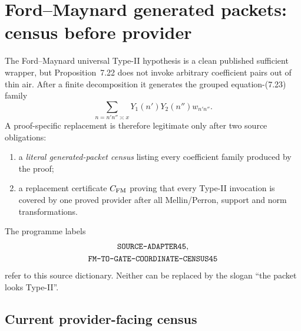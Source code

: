 \documentclass[11pt]{article}
\theoremstyle{definition}
\newcommand{\1}{\mathbf 1}
\begin{document}
\section{Ford--Maynard generated packets: census before provider}
\label{sec:ford-census}

The Ford--Maynard universal Type-II hypothesis is a clean published sufficient wrapper,
but Proposition~7.22 does not invoke arbitrary coefficient pairs out of thin air.  After a
finite decomposition it generates the grouped equation-(7.23) family
\[
\sum_{n=n'n''\asymp x}Y_1(n')Y_2(n'')w_{n'n''}.
\]
A proof-specific replacement is therefore legitimate only after two source obligations:
\begin{enumerate}[leftmargin=1.7em]
\item a \emph{literal generated-packet census} listing every coefficient family produced by
  the proof;
\item a replacement certificate $C_{\rm FM}$ proving that every Type-II invocation is
  covered by one proved provider after all Mellin/Perron, support and norm transformations.
\end{enumerate}

The programme labels
\[
\begin{gathered}
\text{\ttfamily SOURCE-ADAPTER45},\\
\text{\ttfamily FM-TO-GATE-COORDINATE-CENSUS45}
\end{gathered}
\]
refer to this source dictionary.  Neither can be replaced by the slogan ``the packet looks
Type-II''.

\subsection{Current provider-facing census}
\end{document}
